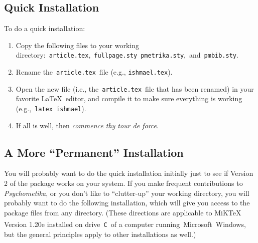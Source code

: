 \documentclass[titlepage,12pt]{article}
\begin{document}
\subsection{Quick Installation}

To do a quick installation:

\begin{enumerate}

\item Copy the following files to your working
directory:\ \texttt{article.tex},\ \texttt{fullpage.sty}\
\texttt{pmetrika.sty},\ and\ \texttt{pmbib.sty}.

\item Rename the~\texttt{article.tex}~file (e.g., \texttt{ishmael.tex}).

\item Open the new file (i.e., the~\texttt{article.tex}~file that has been renamed) in your favorite \LaTeX\
editor, and compile it to make sure everything is working
(e.g.,~\texttt{latex ishmael}).

\item If all is well, then \textit{commence thy tour de force}.

\end{enumerate}

\subsection{A More ``Permanent'' Installation}

You will probably want to do the quick installation initially just
to see if Version 2 of the package works on your system. If you
make frequent contributions to \textit{Psychometika}, or you don't
like to ``clutter-up'' your working directory, you will probably
want to do the following installation, which will give you
access to the package files from any directory. (These directions
are applicable to MiKTeX Version 1.20e installed on
drive~\verb=C=~of a computer
running~\textsf{Microsoft\textsuperscript{\textregistered}~Windows},
but the general principles apply to other installations as well.)

\shortpage %
\end{document}
